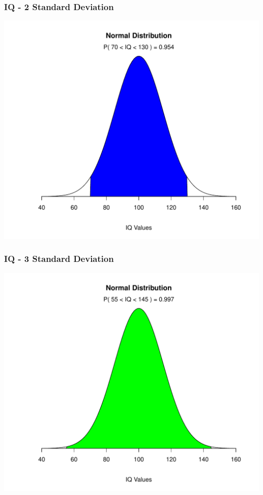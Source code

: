 \documentclass[dvipsnames]{beamer}\usepackage[]{graphicx}\usepackage[]{color}
\makeatletter
\def\maxwidth{ %
  \ifdim\Gin@nat@width>\linewidth
    \linewidth
  \else
    \Gin@nat@width
  \fi
}
\newenvironment{knitrout}{}{} %
\makeatother
\begin{document}
\begin{frame}
\frametitle{IQ - 2 Standard Deviation}
\begin{knitrout}
\color{fgcolor}

{\centering \includegraphics[width=\maxwidth]{figure/unnamed-chunk-11-1} 

}



\end{knitrout}
\end{frame}

\begin{frame}
\frametitle{IQ - 3 Standard Deviation}
\begin{knitrout}
\color{fgcolor}

{\centering \includegraphics[width=\maxwidth]{figure/unnamed-chunk-12-1} 

}



\end{knitrout}
\end{frame}
\end{document}
